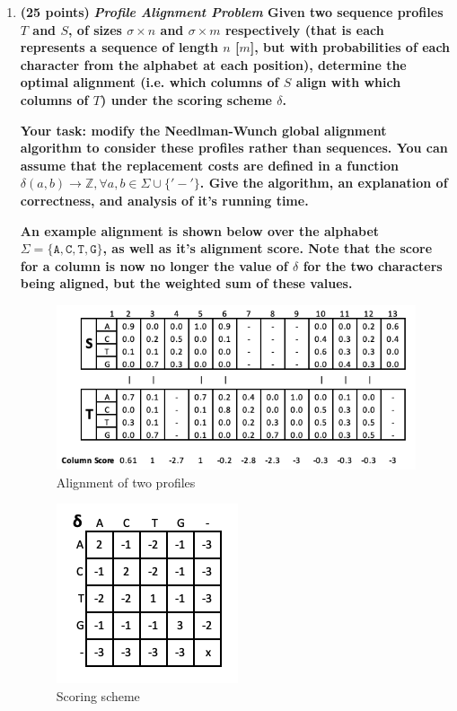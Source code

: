 \documentclass[11pt, oneside]{article}   	%
\begin{document}
\begin{enumerate}
\item \textbf{(25 points)} 
\textbf{\emph{Profile Alignment Problem} Given two sequence profiles $T$ and $S$,  of sizes $\sigma \times n$ and $\sigma \times m$ respectively 
(that is each represents a sequence of length $n$ [$m$], but with probabilities of each character from the alphabet at each position), 
determine the optimal alignment (i.e. which columns of $S$ align with which columns of $T$) under the scoring scheme $\delta$.}

\textbf{Your task: \textbf{modify} the Needlman-Wunch global alignment algorithm to consider these profiles rather than sequences. 
You can assume that the replacement costs are defined in a function $\delta(a,b) \rightarrow \mathbb{Z} , \forall a,b \in \Sigma \cup \{'-'\}$.
Give the algorithm, an explanation of correctness, and analysis of it's running time. }

\textbf{An example alignment is shown below over the alphabet $\Sigma=\{\texttt{A},\texttt{C},\texttt{T},\texttt{G}\}$, as well as it's alignment score. 
Note that the score for a column is now no longer the value of $\delta$ for the two characters being aligned, but the weighted sum of these values.}


\begin{figure}[h!] %
\begin{centering}
\includegraphics{HW3_Align}
\caption{Alignment of two profiles}
\end{centering}
\end{figure}

\begin{figure}[h!]
\begin{centering}
\includegraphics{HW3_Delta}
\caption{Scoring scheme}
\end{centering}
\end{figure}

\end{enumerate}
\end{document}

